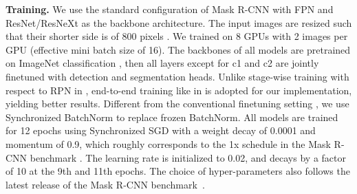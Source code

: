 \documentclass[10pt,twocolumn,letterpaper]{article}
\begin{document}
\textbf{Training.}
We use the standard configuration of Mask R-CNN \cite{he2017mask} with FPN and ResNet/ResNeXt as the backbone architecture.
The input images are resized such that their shorter side is of 800 pixels \cite{he2017fpn}.
We trained on 8 GPUs with 2 images per GPU (effective mini batch size of 16).
The backbones of all models are pretrained on ImageNet classification \cite{deng2009imagenet}, then all layers except for c1 and c2 are jointly finetuned with detection and segmentation heads.
Unlike stage-wise training with respect to RPN in \cite{he2017mask}, end-to-end training like in \cite{ren2015faster} is adopted for our implementation, yielding better results.
Different from the conventional finetuning setting \cite{he2017mask}, we use Synchronized BatchNorm to replace frozen BatchNorm.
All models are trained for 12 epochs using Synchronized SGD with a weight decay of 0.0001 and momentum of 0.9, which roughly corresponds to the 1x schedule in the Mask R-CNN benchmark \cite{massa2018mrcnn}.
The learning rate is initialized to 0.02, and decays by a factor of 10 at the 9th and 11th epochs.
The choice of hyper-parameters also follows the latest release of the Mask R-CNN benchmark~\cite{massa2018mrcnn}.
\end{document}
